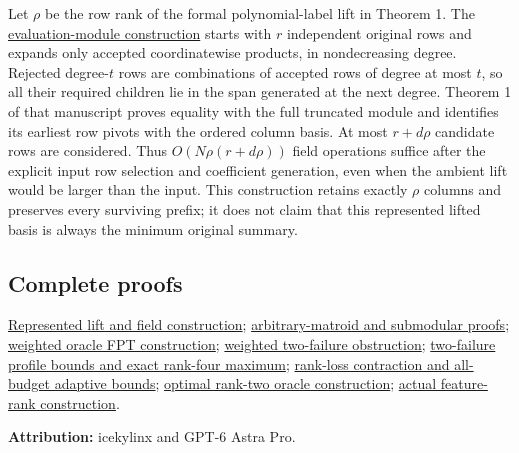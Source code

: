 Let \(\rho\) be the row rank of the formal polynomial-label lift in Theorem 1. The \href{https://github.com/icekylinx/algorithm-frontier/blob/main/problems/persistence-failure-certificates/manuscripts/feature-rank-construction.md}{evaluation-module construction} starts with \(r\) independent original rows and expands only accepted coordinatewise products, in nondecreasing degree. Rejected degree-\(t\) rows are combinations of accepted rows of degree at most \(t\), so all their required children lie in the span generated at the next degree. Theorem 1 of that manuscript proves equality with the full truncated module and identifies its earliest row pivots with the ordered column basis. At most \(r+d\rho\) candidate rows are considered. Thus \(O(N\rho(r+d\rho))\) field operations suffice after the explicit input row selection and coefficient generation, even when the ambient lift would be larger than the input. This construction retains exactly \(\rho\) columns and preserves every surviving prefix; it does not claim that this represented lifted basis is always the minimum original summary.

\hypertarget{af-240b5086c5-complete-proofs}{%
\subsection{Complete proofs}\label{af-240b5086c5-complete-proofs}}

\href{https://github.com/icekylinx/algorithm-frontier/blob/main/problems/matroid-failure-summaries/manuscripts/sharp-represented-matroid-failure-summaries.md}{Represented lift and field construction}; \href{https://github.com/icekylinx/algorithm-frontier/blob/main/problems/matroid-failure-summaries/manuscripts/arbitrary-matroid-and-submodular-failure-summaries.md}{arbitrary-matroid and submodular proofs}; \href{https://github.com/icekylinx/algorithm-frontier/blob/main/problems/matroid-failure-summaries/manuscripts/weighted-oracle-prefix-fpt-construction.md}{weighted oracle FPT construction}; \href{https://github.com/icekylinx/algorithm-frontier/blob/main/problems/matroid-failure-summaries/manuscripts/weighted-oracle-two-failure-obstruction.md}{weighted two-failure obstruction}; \href{https://github.com/icekylinx/algorithm-frontier/blob/main/problems/matroid-failure-summaries/manuscripts/two-failure-oracle-prefix-bounds.md}{two-failure profile bounds and exact rank-four maximum}; \href{https://github.com/icekylinx/algorithm-frontier/blob/main/problems/matroid-failure-summaries/manuscripts/rank-loss-contraction-for-prefix-summaries.md}{rank-loss contraction and all-budget adaptive bounds}; \href{https://github.com/icekylinx/algorithm-frontier/blob/main/problems/matroid-failure-summaries/manuscripts/optimal-rank-two-prefix-oracle-construction.md}{optimal rank-two oracle construction}; \href{https://github.com/icekylinx/algorithm-frontier/blob/main/problems/persistence-failure-certificates/manuscripts/feature-rank-construction.md}{actual feature-rank construction}.

\textbf{Attribution:} icekylinx and GPT-6 Astra Pro.
